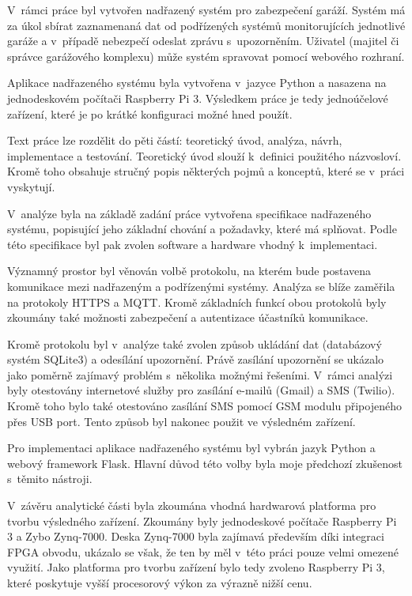 
V~rámci práce byl vytvořen nadřazený systém pro zabezpečení garáží. Systém má za úkol sbírat zaznamenaná dat od podřízených systémů monitorujících jednotlivé garáže a v~případě nebezpečí odeslat zprávu s~upozorněním. Uživatel (majitel či správce garážového komplexu) může systém spravovat pomocí webového rozhraní.

Aplikace nadřazeného systému byla vytvořena v~jazyce Python a nasazena na jednodeskovém počítači Raspberry Pi 3. Výsledkem práce je tedy jednoúčelové zařízení, které je po krátké konfiguraci možné hned použít.

Text práce lze rozdělit do pěti částí: teoretický úvod, analýza, návrh, implementace a testování. Teoretický úvod slouží k~definici použitého názvosloví. Kromě toho obsahuje stručný popis některých pojmů a konceptů, které se v~práci vyskytují.

V~analýze byla na základě zadání práce vytvořena specifikace nadřazeného systému, popisující jeho základní chování a požadavky, které má splňovat. Podle této specifikace byl pak zvolen software a hardware vhodný k~implementaci.

Významný prostor byl věnován volbě protokolu, na kterém bude postavena komunikace mezi nadřazeným a podřízenými systémy. Analýza se blíže zaměřila na protokoly HTTPS a MQTT. Kromě základních funkcí obou protokolů byly zkoumány také možnosti zabezpečení a autentizace účastníků komunikace.

Kromě protokolu byl v~analýze také zvolen způsob ukládání dat (databázový systém SQLite3) a odesílání upozornění. Právě zasílání upozornění se ukázalo jako poměrně zajímavý problém s~několika možnými řešeními. V~rámci analýzi byly otestovány internetové služby pro zasílání e-mailů (Gmail) a SMS (Twilio). Kromě toho bylo také otestováno zasílání SMS pomocí GSM modulu připojeného přes USB port. Tento způsob byl nakonec použit ve výsledném zařízení.

Pro implementaci aplikace nadřazeného systému byl vybrán jazyk Python a webový framework Flask. Hlavní důvod této volby byla moje předchozí zkušenost s~těmito nástroji.

V~závěru analytické části byla zkoumána vhodná hardwarová platforma pro tvorbu výsledného zařízení. Zkoumány byly jednodeskové počítače Raspberry Pi 3 a Zybo Zynq-7000. Deska Zynq-7000 byla zajímavá především díki integraci FPGA obvodu, ukázalo se však, že ten by měl v~této práci pouze velmi omezené využití. Jako platforma pro tvorbu zařízení bylo tedy zvoleno Raspberry Pi 3, které poskytuje vyšší procesorový výkon za výrazně nižší cenu.

